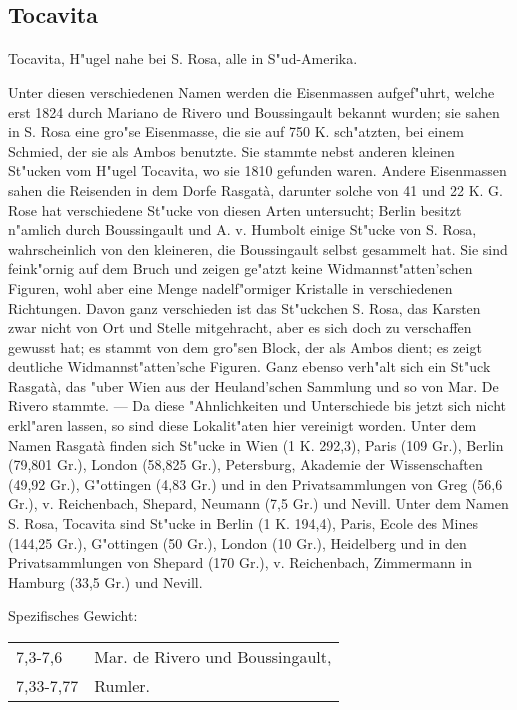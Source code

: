 \documentclass[a4paper, 11pt, oneside]{article}
\begin{document}
\subsection{Tocavita}
\paragraph{}
Tocavita, H"ugel nahe bei S. Rosa, alle in S"ud-Amerika.

Unter diesen verschiedenen Namen werden die Eisenmassen aufgef"uhrt, welche erst 1824 durch Mariano de Rivero und Boussingault bekannt wurden; sie sahen in S. Rosa eine gro"se Eisenmasse, die sie auf 750 K. sch"atzten, bei einem Schmied, der sie als Ambos benutzte. Sie stammte nebst anderen kleinen St"ucken vom H"ugel Tocavita, wo sie 1810 gefunden waren. Andere Eisenmassen sahen die Reisenden in dem Dorfe Rasgatà, darunter solche von 41 und 22 K. G. Rose hat verschiedene St"ucke von diesen Arten untersucht; Berlin besitzt n"amlich durch Boussingault und A. v. Humbolt einige St"ucke von S. Rosa, wahrscheinlich von den kleineren, die Boussingault selbst gesammelt hat. Sie sind feink"ornig auf dem Bruch und zeigen ge"atzt keine Widmannst"atten'schen Figuren, wohl aber eine Menge nadelf"ormiger Kristalle in verschiedenen Richtungen. Davon ganz verschieden ist das St"uckchen S. Rosa, das Karsten zwar nicht von Ort und Stelle mitgehracht, aber es sich doch zu verschaffen gewusst hat; es stammt von dem gro"sen Block, der als Ambos dient; es zeigt deutliche Widmannst"atten'sche Figuren. Ganz ebenso verh"alt sich ein St"uck Rasgatà, das "uber Wien aus der Heuland'schen Sammlung und so von Mar. De Rivero stammte. --- Da diese "Ahnlichkeiten und Unterschiede bis jetzt sich nicht erkl"aren lassen, so sind diese Lokalit"aten hier vereinigt worden. Unter dem Namen Rasgatà finden sich St"ucke in Wien (1 K. 292,3), Paris (109 Gr.), Berlin (79,801 Gr.), London (58,825 Gr.), Petersburg, Akademie der Wissenschaften (49,92 Gr.), G"ottingen (4,83 Gr.) und in den Privatsammlungen von Greg (56,6 Gr.), v. Reichenbach, Shepard, Neumann (7,5 Gr.) und Nevill. Unter dem Namen S. Rosa, Tocavita sind St"ucke in Berlin (1 K. 194,4), Paris, Ecole des Mines (144,25 Gr.), G"ottingen (50 Gr.), London (10 Gr.), Heidelberg und in den Privatsammlungen von Shepard (170 Gr.), v. Reichenbach, Zimmermann in Hamburg (33,5 Gr.) und Nevill.

Spezifisches Gewicht:  
\begin{table}[!ht]
    \centering
    \begin{tabular}{l l}
        7,3-7,6 & Mar. de Rivero und Boussingault,\\
        7,33-7,77 & Rumler.
    \end{tabular}
\end{table}
\end{document}
